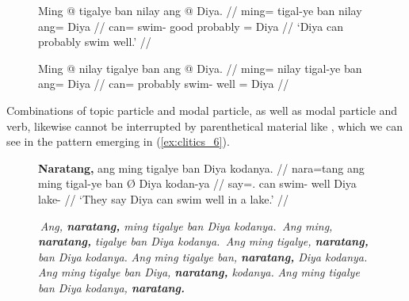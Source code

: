 \begin{figure}
\pex\label{ex:clitics_5}
\a\label{ex:clitics_5a}\begingl
	\gla Ming @ tigalye ban nilay ang @ Diya. //
	\glb ming= tigal-ye ban nilay ang= Diya //
	\glc can= swim-\TsgF{} good probably \Aarg{}= Diya //
	\glft `Diya can probably swim well.' //
\endgl

\a\label{ex:clitics_5b}\ljudge{*}\begingl
	\gla Ming @ nilay tigalye ban ang @ Diya. //
	\glb ming= nilay tigal-ye ban ang= Diya //
	\glc can= probably swim-\TsgF{} well \Aarg{}= Diya //
\endgl
\xe
\end{figure}

Combinations of topic particle and modal particle, as well as modal particle
and verb, likewise cannot be interrupted by parenthetical material like
, which we can see in the pattern emerging in
(\ref{ex:clitics_6}).

\begin{figure}
\pex\label{ex:clitics_6}
\a\label{ex:clitics_6a}\begingl
	\gla \textbf{Naratang,} ang ming tigalye ban {} Diya kodanya. //
	\glb nara=tang ang ming tigal-ye ban Ø Diya kodan-ya //
	\glc say=\TplM{}.\Aarg{} \AgtT{} can swim-\TsgF{} well \Top{} Diya 
		lake-\Loc{}	//
	\glft `They say Diya can swim well in a lake.' //
\endgl

\a \ljudge{*} \textit{Ang, \textbf{naratang,} ming tigalye ban Diya kodanya.}
\a \ljudge{*} \textit{Ang ming, \textbf{naratang,} tigalye ban Diya kodanya.}
\a \ljudge{\ques} \textit{Ang ming tigalye, \textbf{naratang,} ban Diya
	kodanya.}
\a \textit{Ang ming tigalye ban, \textbf{naratang,} Diya kodanya.}
\a \textit{Ang ming tigalye ban Diya, \textbf{naratang,} kodanya.}
\a \textit{Ang ming tigalye ban Diya kodanya, \textbf{naratang.}}
\xe
\end{figure}

